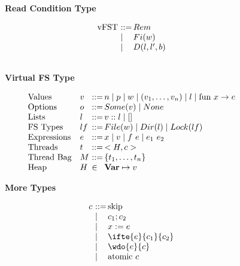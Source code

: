 \begin{figure*}
\begin{minipage}[t]{0.24\linewidth}
\begin{displaymath}
\end{displaymath}
\centerline{\textbf{Read Condition Type}}
\end{minipage}
\begin{minipage}[t]{0.24\linewidth}
\begin{displaymath}
\begin{array}{l@{~}l@{\,}ll@{}}
 \text{vFST} & ::= & Rem \\
 & \mid & Fi(w) \\
 & \mid & D(l,l',b) \\
 & &
\end{array}
\end{displaymath}
\centerline{\textbf{Virtual FS Type}}
\end{minipage}
\begin{minipage}[t]{0.5\linewidth}
\begin{displaymath}
\begin{array}{l@{\quad}l@{~}l@{\,}ll@{}}
 \text{Values} & v  & ::= & n \mid p \mid w \mid (v_1,\dots,v_n) \mid l \mid \text{fun } x \rightarrow e \\
 \text{Options} & o  & ::= & Some(v) \mid None \\
 \text{Lists} & l  & ::= & v :: l \mid [] \\
 \text{FS Types} & lf & ::= & File(w) \mid Dir(l) \mid Lock(lf) \\
 \text{Expressions} & e  & ::= & x \mid v \mid f~e \mid e_1~e_2 \\ 
 \text{Threads} & t  & ::= & <H,c> \\ 
 \text{Thread Bag} & M  & ::= & \{t_1,\dots,t_n\} \\
 \text{Heap} & H & \in &\textbf{Var} \mapsto v
\end{array}
\end{displaymath}
\centerline{\textbf{More Types}}
\end{minipage}
\begin{minipage}[t]{0.25\linewidth}
\begin{displaymath}
\begin{array}{l@{~}l@{\,}ll@{}}
 c & ::= & \text{skip} \\
 & \mid & c_1;c_2 \\
 & \mid & x := e \\
 & \mid & \ifte{e}{c_1}{c_2}\\
 & \mid & \wdo{e}{c} \\
 & \mid & \text{atomic } c \\ \\ \\

\end{array}
\end{displaymath}
\end{minipage}
\end{figure*}

